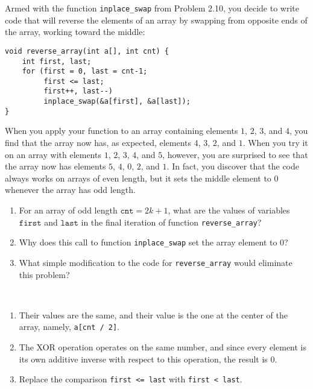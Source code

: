 \documentclass[12pt]{article}
\newenvironment{ex}[2][Exercise]{\begin{trivlist}
		\item[\hskip \labelsep {\bfseries #1}\hskip \labelsep {\bfseries #2.}]}{\end{trivlist}}
\newenvironment{sol}[1][Solution]{\begin{trivlist}
		\item[\hskip \labelsep {\bfseries #1:}]}{\end{trivlist}}
\begin{document}
\begin{ex}{2.11}
	Armed with the function \texttt{inplace\_swap} from Problem 2.10, you decide to write
	code that will reverse the elements of an array by swapping from opposite ends of the
	array, working toward the middle:
	\begin{lstlisting}
void reverse_array(int a[], int cnt) {
	int first, last;
	for (first = 0, last = cnt-1;
	     first <= last;
	     first++, last--)
	     inplace_swap(&a[first], &a[last]);
}
	\end{lstlisting}
	When you apply your function to an array containing elements $1$, $2$, $3$, and $4$,
	you find that the array now has, as expected, elements $4$, $3$, $2$, and $1$. When
	you try it on an array with elements $1$, $2$, $3$, $4$, and $5$, however, you are
	surprised to see that the array now has elements $5$, $4$, $0$, $2$, and $1$. In
	fact, you discover that the code always works on arrays of even length, but it sets
	the middle element to 0 whenever the array has odd length.
	\begin{enumerate}[label=(\alph*)]
		\item For an array of odd length $\texttt{cnt}=2k+1$, what are the values of
		variables $\texttt{first}$ and $\texttt{last}$ in the final iteration of
		function \texttt{reverse\_array}?
		\item Why does this call to function \texttt{inplace\_swap} set the array element
		to 0?
		\item What simple modification to the code for \texttt{reverse\_array} would
		eliminate this problem?
	\end{enumerate}
\end{ex}

\begin{sol}
	\
	\begin{enumerate}[label=(\alph*)]
		\item Their values are the same, and their value is the one at
		the center of the array, namely, \texttt{a[cnt / 2]}.
		\item The XOR operation operates on the same number, and
		since every element is its own additive inverse with respect to
		this operation, the result is 0.
		\item Replace the comparison \texttt{first <= last} with
		\texttt{first < last}.
	\end{enumerate}
\end{sol}
\end{document}
